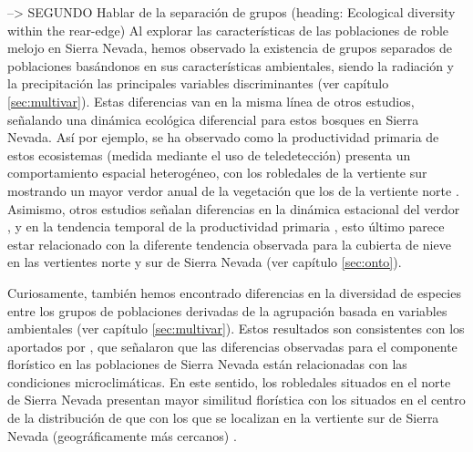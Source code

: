 --> SEGUNDO Hablar de la separación de grupos (heading: Ecological diversity within the rear-edge) 
Al explorar las características de las poblaciones de roble melojo en Sierra Nevada, hemos observado la existencia de grupos separados de poblaciones basándonos en sus características ambientales, siendo la radiación y la precipitación las principales variables discriminantes (ver capítulo \ref{sec:multivar}). Estas diferencias van en la misma línea de otros estudios, señalando una dinámica ecológica diferencial para estos bosques en Sierra Nevada. Así por ejemplo, se ha observado como la productividad primaria de estos ecosistemas (medida mediante el uso de teledetección) presenta un comportamiento espacial heterogéneo, con los robledales de la vertiente sur mostrando un mayor verdor anual de la vegetación que los de la vertiente norte \autocites[ver capítulo \ref{sec:onto} ][]{Dionisioetal2012SatelliteBasedMonitoring,PerezLuqueetal2015OntologicalSystem,PerezLuqueetal2020LanduseLegacies}. Asimismo, otros estudios señalan diferencias en la dinámica estacional del verdor \autocite{Dionisioetal2012SatelliteBasedMonitoring}, y en la tendencia temporal de la productividad primaria \autocites{PerezLuqueetal2015OntologicalSystem,AlcarazSeguraetal2016ChangesVegetation}, esto último parece estar relacionado con la diferente tendencia observada para la cubierta de nieve en las vertientes norte y sur de Sierra Nevada (ver capítulo \ref{sec:onto}).  

Curiosamente, también hemos encontrado diferencias en la diversidad de especies entre los grupos de poblaciones derivadas de la agrupación basada en variables ambientales (ver capítulo \ref{sec:multivar}). Estos resultados son consistentes con los aportados por \textcite{Loriteetal2008PhytosociologicalReview}, que señalaron que las diferencias observadas para el componente florístico en las poblaciones de \Qp Sierra Nevada están relacionadas con las condiciones microclimáticas. En este sentido, los robledales situados en el norte de Sierra Nevada presentan mayor similitud florística con los situados en el centro de la distribución de \Qp que con los que se localizan en la vertiente sur de Sierra Nevada (geográficamente más cercanos) \autocites{Loriteetal2008PhytosociologicalReview}. 

